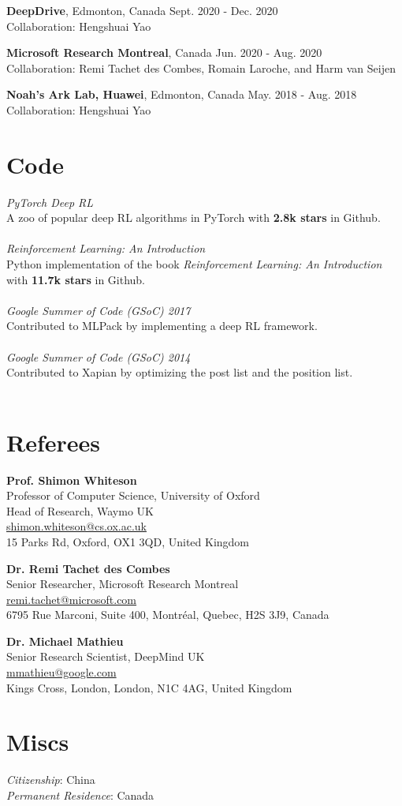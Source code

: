 \documentclass[margin, 10pt]{res} %
\newcommand*{\code}[2]{{{\sl #1} \\ #2 \\\\}}
\begin{document}
\begin{resume}
{\textbf{DeepDrive}, Edmonton, Canada} \hfill Sept. 2020 - Dec. 2020 \\
Collaboration: Hengshuai Yao

{\textbf{Microsoft Research Montreal}, Canada} \hfill Jun. 2020 - Aug. 2020 \\
Collaboration: Remi Tachet des Combes, Romain Laroche, and Harm van Seijen  

{\textbf{Noah's Ark Lab, Huawei}, Edmonton, Canada} \hfill May. 2018 - Aug. 2018 \\
Collaboration: Hengshuai Yao

\section{Code}
\code{PyTorch Deep RL}{A zoo of popular deep RL algorithms in PyTorch with \textbf{2.8k stars} in Github.}
\code{{Reinforcement Learning: An Introduction}}{Python implementation of the book \textit{Reinforcement Learning: An Introduction} \\ with \textbf{11.7k stars} in Github.}
\code{{Google Summer of Code (GSoC) 2017}}{Contributed to MLPack by implementing a deep RL framework.}
\code{{Google Summer of Code (GSoC) 2014}}{Contributed to Xapian by optimizing the post list and the position list.}



\ifdefined{}
\section{Referees}

\textbf{Prof. Shimon Whiteson} \\
Professor of Computer Science, University of Oxford \\
Head of Research, Waymo UK \\
\href{mailto:shimon.whiteson@cs.ox.ac.uk}{shimon.whiteson@cs.ox.ac.uk} \\
15 Parks Rd, Oxford, OX1 3QD, United Kingdom

\textbf{Dr. Remi Tachet des Combes} \\
Senior Researcher, Microsoft Research Montreal \\
\href{mailto:remi.tachet@microsoft.com}{remi.tachet@microsoft.com} \\
6795 Rue Marconi, Suite 400, Montréal, Quebec, H2S 3J9, Canada

\textbf{Dr. Michael Mathieu} \\
Senior Research Scientist, DeepMind UK \\
\href{mailto:mmathieu@google.com}{mmathieu@google.com} \\
Kings Cross, London, London, N1C 4AG, United Kingdom
\fi

\ifdefined\misc
\section{Miscs}
{\sl Citizenship}: China \\
{\sl Permanent Residence}: Canada \\
\fi
\end{resume}
\end{document}
